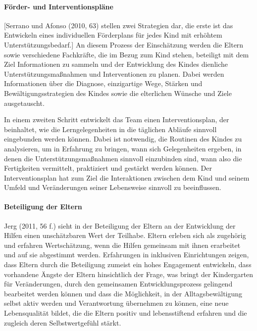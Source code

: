 \paragraph{Förder- und Interventionspläne} 
[Serrano und Afonso (2010, 63) stellen zwei Strategien dar, die erste ist das Entwickeln eines individuellen Förderplans für jedes Kind mit erhöhtem Unterstützungsbedarf.] An diesem Prozess der Einschätzung werden die Eltern sowie verschiedene Fachkräfte, die im Bezug zum Kind stehen, beteiligt mit dem Ziel Informationen zu sammeln und der Entwicklung des Kindes dienliche Unterstützungsmaßnahmen und Interventionen zu planen. Dabei werden Informationen über die Diagnose, einzigartige Wege, Stärken und Bewältigungsstrategien des Kindes sowie die elterlichen Wünsche und Ziele ausgetauscht. 

In einem zweiten Schritt entwickelt das Team einen Interventionsplan, der beinhaltet, wie die Lerngelegenheiten in die täglichen Abläufe sinnvoll eingebunden werden können. Dabei ist notwendig, die Routinen des Kindes zu analysieren, um in Erfahrung zu bringen, wann sich Gelegenheiten ergeben, in denen die Unterstützungsmaßnahmen sinnvoll einzubinden sind, wann also die Fertigkeiten vermittelt, praktiziert und gestärkt werden können. Der Interventionsplan hat zum Ziel die Interaktionen zwischen dem Kind und seinem Umfeld und Veränderungen seiner Lebensweise sinnvoll zu beeinflussen.  

\paragraph{Beteiligung der Eltern} Jerg (2011, 56 f.) sieht in der Beteiligung der Eltern an der Entwicklung der Hilfen einen unschätzbaren Wert der Teilhabe. Eltern erleben sich als zugehörig und erfahren Wertschätzung, wenn die Hilfen gemeinsam mit ihnen erarbeitet und auf sie abgestimmt werden. Erfahrungen in inklusiven Einrichtungen zeigen, dass Eltern durch die Beteiligung zumeist ein hohes Engagement entwickeln, dass vorhandene Ängste der Eltern hinsichtlich der Frage, was bringt der Kindergarten für Veränderungen, durch den gemeinsamen Entwicklungsprozess gelingend bearbeitet werden können und dass die Möglichkeit, in der Alltagsbewältigung selbst aktiv werden und Verantwortung übernehmen zu können, eine neue Lebensqualität bildet, die die Eltern positiv und lebensstiftend erfahren und die zugleich deren Selbstwertgefühl stärkt.     

